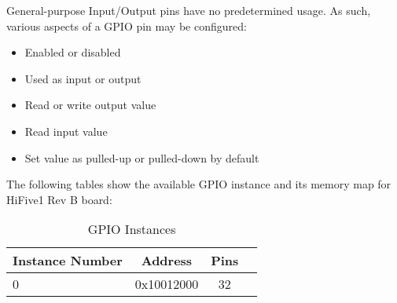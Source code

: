 General-purpose Input/Output pins have no predetermined usage. As such, various aspects of a GPIO pin may be configured:\cite{giometti2017gnu}
\begin{itemize}
    \item Enabled or disabled
    \item Used as input or output
    \item Read or write output value
    \item Read input value
    \item Set value as pulled-up or pulled-down by default
\end{itemize}

The following tables show the available GPIO instance and its memory map for HiFive1 Rev B board:
\begin{table}[H]
    \centering
    \begin{tabular}{| p{3cm} | c | c | p{3cm} |}
        \hline
        \textbf{Instance Number} & \textbf{Address} & \textbf{Pins}\\
        \hline
        \hline
        0 & 0x10012000 & 32\\
        \hline
    \end{tabular}
    \caption{GPIO Instances}
\end{table}

